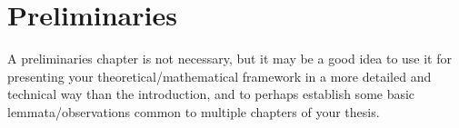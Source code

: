 
\chapter{Preliminaries}
\label{chap:prelims}

A preliminaries chapter is not necessary, but it may be a good idea to use it for presenting your theoretical/mathematical framework in a more detailed and technical way than the introduction, and to perhaps establish some basic lemmata/observations common to multiple chapters of your thesis.


